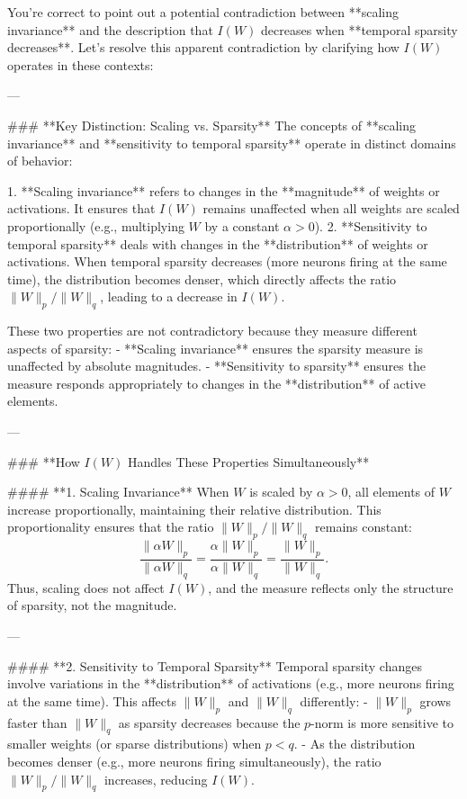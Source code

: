 You’re correct to point out a potential contradiction between **scaling invariance** and the description that \( I(W) \) decreases when **temporal sparsity decreases**. Let's resolve this apparent contradiction by clarifying how \( I(W) \) operates in these contexts:

---

### **Key Distinction: Scaling vs. Sparsity**
The concepts of **scaling invariance** and **sensitivity to temporal sparsity** operate in distinct domains of behavior:

1. **Scaling invariance** refers to changes in the **magnitude** of weights or activations. It ensures that \( I(W) \) remains unaffected when all weights are scaled proportionally (e.g., multiplying \( W \) by a constant \( \alpha > 0 \)).
2. **Sensitivity to temporal sparsity** deals with changes in the **distribution** of weights or activations. When temporal sparsity decreases (more neurons firing at the same time), the distribution becomes denser, which directly affects the ratio \( \|W\|_p / \|W\|_q \), leading to a decrease in \( I(W) \).

These two properties are not contradictory because they measure different aspects of sparsity:
- **Scaling invariance** ensures the sparsity measure is unaffected by absolute magnitudes.
- **Sensitivity to sparsity** ensures the measure responds appropriately to changes in the **distribution** of active elements.

---

### **How \( I(W) \) Handles These Properties Simultaneously**

#### **1. Scaling Invariance**
When \( W \) is scaled by \( \alpha > 0 \), all elements of \( W \) increase proportionally, maintaining their relative distribution. This proportionality ensures that the ratio \( \|W\|_p / \|W\|_q \) remains constant:
\[
\frac{\|\alpha W\|_p}{\|\alpha W\|_q} = \frac{\alpha \|W\|_p}{\alpha \|W\|_q} = \frac{\|W\|_p}{\|W\|_q}.
\]
Thus, scaling does not affect \( I(W) \), and the measure reflects only the structure of sparsity, not the magnitude.

---

#### **2. Sensitivity to Temporal Sparsity**
Temporal sparsity changes involve variations in the **distribution** of activations (e.g., more neurons firing at the same time). This affects \( \|W\|_p \) and \( \|W\|_q \) differently:
- \( \|W\|_p \) grows faster than \( \|W\|_q \) as sparsity decreases because the \( p \)-norm is more sensitive to smaller weights (or sparse distributions) when \( p < q \).
- As the distribution becomes denser (e.g., more neurons firing simultaneously), the ratio \( \|W\|_p / \|W\|_q \) increases, reducing \( I(W) \).

